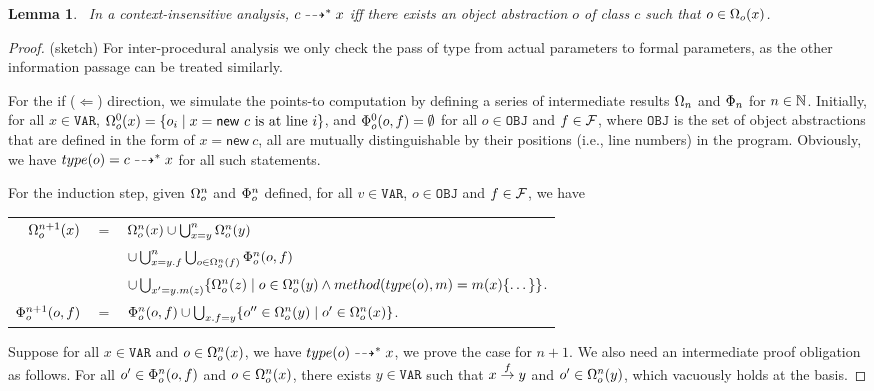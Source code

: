 \documentclass{llncs}
\newtheorem{Lemma}{Lemma}
\newcommand\set[1]{\{#1\}}
\newcommand{\keyword}[1]{\mathsf{#1}}
\newcommand{\kwnew}[0]{\keyword{new}}
\newcommand\Var{\mathtt{VAR}}
\newcommand\Obj{\mathtt{OBJ}}
\begin{document}
\begin{Lemma}~\label{lem:tfa}
  In a context-insensitive analysis, $c\dashrightarrow^*x$ iff there exists an object abstraction $o$ of class $c$ such that $o\in\Omega_o(x)$.
\end{Lemma}
\begin{proof} (sketch)
For inter-procedural analysis we only check the pass of type from actual parameters to formal parameters, as the
other information passage can be treated similarly.

For the if ($\Leftarrow$) direction, we simulate the points-to computation by defining 
a series of intermediate results $\Omega_n$ and $\Phi_n$ for $n\in\mathbb{N}$.
Initially, for all $x\in\Var$, $\VPT^0_o(x)=\set{o_i\mid x = \kwnew\ c\mbox{ is at line }i}$, and 
$\Phi^0_o(o,f)=\emptyset$ for all $o\in\Obj$ and $f\in\mathcal{F}$, where $\Obj$ is the set of object abstractions
that are defined in the form of $x = \kwnew\ c$, all are mutually distinguishable by their positions (i.e., line numbers) in the program.
Obviously, we have $type(o)=c\dashrightarrow^* x$ for all such statements.

For the induction step, given $\Omega^n_o$ and $\Phi^n_o$ defined, for all $v\in\Var$, $o\in\Obj$ and $f\in\mathcal{F}$, we have\\
\begin{tabular}[c]{rll}
      \hspace{30pt}$\Omega^{n+1}_o(x)$ & $=$ & $\Omega^{n}_o(x)\cup\bigcup_{x=y}^n\Omega_o^n(y)$\\
      & & $\cup\bigcup_{x=y.f}^n\bigcup_{o\in\Omega_o^n(f)}\Phi_o^n(o,f)$\\
      & & $\cup\bigcup_{x'=y.m(z)}\set{\VPT^n_o(z)\mid o\in \VPT^n_o(y)\wedge method(type(o),m)=m(x)\{\dots\}}$.\\
      $\Phi^{n+1}_o(o,f)$ & $=$ & $\HPT^n_o(o,f)\cup\bigcup_{x.f=y}\set{o''\in\VPT^n_o(y)\mid o'\in\VPT^n_o(x)}$.      
\end{tabular}
Suppose for all $x\in\Var$ and $o\in\Omega^n_o(x)$, we have $type(o)\dashrightarrow^* x$, we prove the case for $n+1$.
We also need an intermediate proof obligation as follows. For all $o'\in\Phi^n_o(o,f)$ and $o\in\Omega^n_o(x)$,
there exists $y\in\Var$ such that $x\stackrel{f}{\rightarrow}y$ and $o'\in\Omega^n_o(y)$, which vacuously holds at the basis.

\smallskip


\end{proof}
\end{document}
